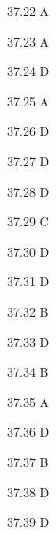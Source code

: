 \begin{Solution}{37.{22}}
A
\end{Solution}
\begin{Solution}{37.{23}}
A
\end{Solution}
\begin{Solution}{37.{24}}
D
\end{Solution}
\begin{Solution}{37.{25}}
A
\end{Solution}
\begin{Solution}{37.{26}}
D
\end{Solution}
\begin{Solution}{37.{27}}
D
\end{Solution}
\begin{Solution}{37.{28}}
D
\end{Solution}
\begin{Solution}{37.{29}}
C
\end{Solution}
\begin{Solution}{37.{30}}
D
\end{Solution}
\begin{Solution}{37.{31}}
D
\end{Solution}
\begin{Solution}{37.{32}}
B
\end{Solution}
\begin{Solution}{37.{33}}
D
\end{Solution}
\begin{Solution}{37.{34}}
B
\end{Solution}
\begin{Solution}{37.{35}}
A
\end{Solution}
\begin{Solution}{37.{36}}
D
\end{Solution}
\begin{Solution}{37.{37}}
B
\end{Solution}
\begin{Solution}{37.{38}}
D
\end{Solution}
\begin{Solution}{37.{39}}
D
\end{Solution}

